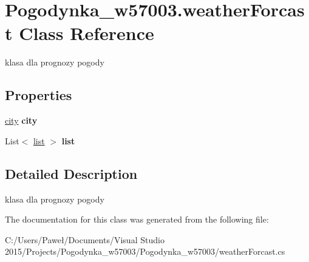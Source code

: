 \hypertarget{class_pogodynka__w57003_1_1weather_forcast}{}\section{Pogodynka\+\_\+w57003.\+weather\+Forcast Class Reference}
\label{class_pogodynka__w57003_1_1weather_forcast}


klasa dla prognozy pogody  


\subsection*{Properties}
\begin{DoxyCompactItemize}
\item 
\mbox{\label{class_pogodynka__w57003_1_1weather_forcast_ab3948b92f20a1509d2053e46ee326b2c}} 
\mbox{\hyperlink{class_pogodynka__w57003_1_1city}{city}} {\bfseries city}
\item 
\mbox{\label{class_pogodynka__w57003_1_1weather_forcast_a50b551a6ea78490be372e8b8511e1713}} 
List$<$ \mbox{\hyperlink{class_pogodynka__w57003_1_1list}{list}} $>$ {\bfseries list}
\end{DoxyCompactItemize}


\subsection{Detailed Description}
klasa dla prognozy pogody 



The documentation for this class was generated from the following file\+:\begin{DoxyCompactItemize}
\item 
C\+:/\+Users/\+Paweł/\+Documents/\+Visual Studio 2015/\+Projects/\+Pogodynka\+\_\+w57003/\+Pogodynka\+\_\+w57003/weather\+Forcast.\+cs\end{DoxyCompactItemize}
